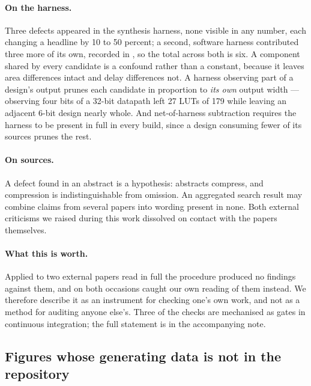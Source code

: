 \paragraph{On the harness.} Three defects appeared in the synthesis harness, none
visible in any number, each changing a headline by 10 to 50 percent; a second,
software harness contributed three more of its own, recorded in
, so the total across both is six. A component shared by every
candidate is a confound rather than a constant, because it leaves area
differences intact and delay differences not. A harness observing part of a
design's output prunes each candidate in proportion to \emph{its own} output
width --- observing four bits of a 32-bit datapath left 27 LUTs of 179 while
leaving an adjacent 6-bit design nearly whole. And net-of-harness subtraction
requires the harness to be present in full in every build, since a design
consuming fewer of its sources prunes the rest.

\paragraph{On sources.} A defect found in an abstract is a hypothesis: abstracts
compress, and compression is indistinguishable from omission. An aggregated
search result may combine claims from several papers into wording present in
none. Both external criticisms we raised during this work dissolved on contact
with the papers themselves.


\paragraph{What this is worth.} Applied to two external papers read in full the
procedure produced no findings against them, and on both occasions caught our own
reading of them instead. We
therefore describe it as an instrument for checking one's own work, and not as a
method for auditing anyone else's. Three of the checks are mechanised as gates in
continuous integration; the full statement is in the accompanying note.





\subsection{Figures whose generating data is not in the repository}
\label{sec:provenance}

